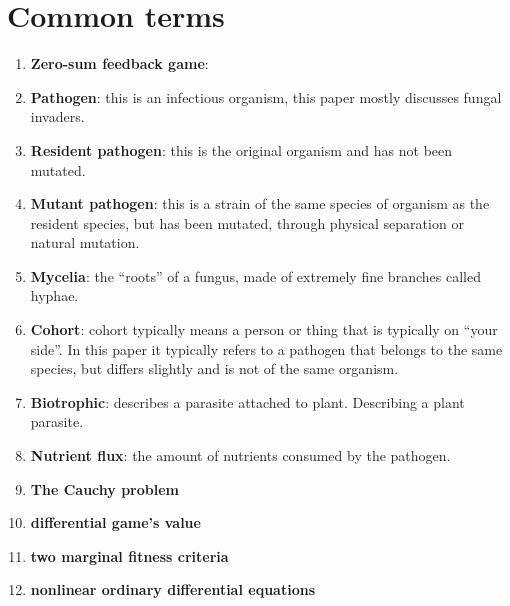\documentclass[11pt]{amsart}
\begin{document}
\appendix

\section{Common terms}\label{terms}
\begin{enumerate}
    \item\label{term:zerosum} \textbf{Zero-sum feedback game}: 
    \item\label{term:pathogen} \textbf{Pathogen}: this is an infectious organism, this paper mostly discusses fungal invaders.
    \item\label{term:resident} \textbf{Resident pathogen}: this is the original organism and has not been mutated.
    \item\label{term:mutant} \textbf{Mutant pathogen}: this is a strain of the same species of organism as the resident species, but has been mutated, through physical separation or natural mutation.
    \item\label{term:mycelia} \textbf{Mycelia}: the ``roots'' of a fungus, made of extremely fine branches called hyphae. 
    \item\label{term:cohort} \textbf{Cohort}: cohort typically means a person or thing that is typically on ``your side''. In this paper it typically refers to a pathogen that belongs to the same species, but differs slightly and is not of the same organism.
    \item\label{term:biotrohpic} \textbf{Biotrophic}: describes a parasite attached to plant. Describing a plant parasite.
    \item\label{term:nutrientflux} \textbf{Nutrient flux}: the amount of nutrients consumed by the pathogen.
    \item\label{term:cauchy} \textbf{The Cauchy problem}
    \item\label{term:differentialgame} \textbf{differential game's value}
    \item\label{term:marginal} \textbf{two marginal fitness criteria}
    \item\label{term:nonlinearODE} \textbf{nonlinear ordinary differential equations}
\end{enumerate}
\end{document}
